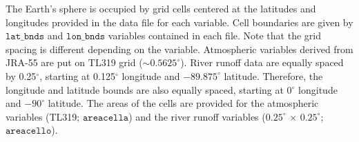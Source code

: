 \documentclass[dvipdfmx]{elsarticle_mod}
\begin{document}
The Earth's sphere is occupied by grid cells centered at the latitudes and longitudes provided in the data file for each variable. Cell boundaries are given by $\texttt{lat\_bnds}$ and $\texttt{lon\_bnds}$ variables contained in each file. Note that the grid spacing is different depending on the variable. Atmospheric variables derived from JRA-55 are put on TL319 grid ($\sim 0.5625^{\circ}$). River runoff data are equally spaced by 0.25$^{\circ}$, starting at 0.125$^{\circ}$ longitude and $-89.875^{\circ}$ latitude. Therefore, the longitude and latitude bounds are also equally spaced, starting at 0$^{\circ}$ longitude and $-90^{\circ}$ latitude. The areas of the cells are provided for the atmospheric variables (TL319; $\mathtt{areacella}$) and the river runoff variables ($0.25^{\circ}\,\times\,0.25^{\circ}$; $\mathtt{areacello}$).
\end{document}
